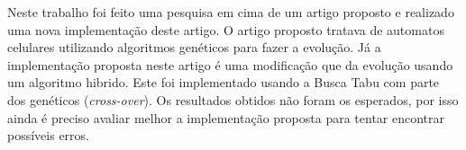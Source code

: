 \documentclass[12pt]{article}
\begin{document}
Neste trabalho foi feito uma pesquisa em cima de um artigo proposto e
realizado uma nova implementação deste artigo. O artigo proposto tratava de
automatos celulares utilizando algoritmos genéticos para fazer a evolução. Já
a implementação proposta neste artigo é uma modificação que da evolução usando
um algoritmo hibrido. Este foi implementado usando a Busca Tabu com parte dos
genéticos (\textit{cross-over}). Os resultados obtidos não foram os esperados,
por isso ainda é preciso avaliar melhor a implementação proposta para tentar
encontrar possíveis erros.




\end{document}
